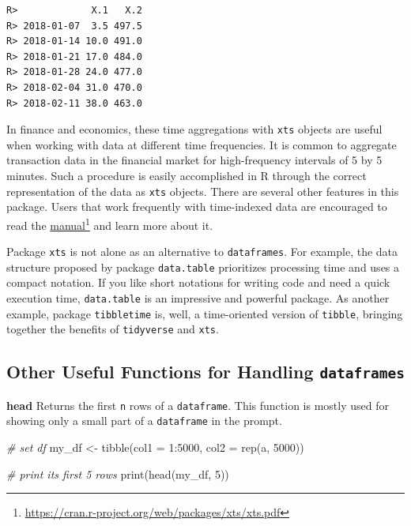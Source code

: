 \documentclass[
  12pt,
]{book}
\newenvironment{Shaded}{\begin{snugshade}}{\end{snugshade}}
\newcommand{\AttributeTok}[1]{\textcolor[rgb]{0.61,0.61,0.61}{#1}}
\newcommand{\CommentTok}[1]{\textcolor[rgb]{0.37,0.37,0.37}{\textit{#1}}}
\newcommand{\DecValTok}[1]{\textcolor[rgb]{0.06,0.06,0.06}{#1}}
\newcommand{\FunctionTok}[1]{\textcolor[rgb]{0,0,0}{#1}}
\newcommand{\NormalTok}[1]{#1}
\newcommand{\OtherTok}[1]{\textcolor[rgb]{0.37,0.37,0.37}{#1}}
\newcommand{\SpecialCharTok}[1]{\textcolor[rgb]{0,0,0}{#1}}
\newcommand{\StringTok}[1]{\textcolor[rgb]{0.5,0.5,0.5}{#1}}
\begin{document}
\begin{verbatim}
R>             X.1   X.2
R> 2018-01-07  3.5 497.5
R> 2018-01-14 10.0 491.0
R> 2018-01-21 17.0 484.0
R> 2018-01-28 24.0 477.0
R> 2018-02-04 31.0 470.0
R> 2018-02-11 38.0 463.0
\end{verbatim}

In finance and economics, these time aggregations with \texttt{xts} objects are useful when working with data at different time frequencies. It is common to aggregate transaction data in the financial market for high-frequency intervals of 5 by 5 minutes. Such a procedure is easily accomplished in R through the correct representation of the data as \texttt{xts} objects. There are several other features in this package. Users that work frequently with time-indexed data are encouraged to read the \href{https://cran.r-project.org/web/packages/xts/xts.pdf}{manual}\footnote{\url{https://cran.r-project.org/web/packages/xts/xts.pdf}} and learn more about it.

Package \texttt{xts} is not alone as an alternative to \texttt{dataframes}. For example, the data structure proposed by package \texttt{data.table} \citep{R-data.table} prioritizes processing time and uses a compact notation. If you like short notations for writing code and need a quick execution time, \texttt{data.table} is an impressive and powerful package. As another example, package \texttt{tibbletime} \citep{R-tibbletime} is, well, a time-oriented version of \texttt{tibble}, bringing together the benefits of \texttt{tidyverse} and \texttt{xts}.  

\hypertarget{other-useful-functions-for-handling-dataframes}{%
\subsection{\texorpdfstring{Other Useful Functions for Handling \texttt{dataframes}}{Other Useful Functions for Handling dataframes}}\label{other-useful-functions-for-handling-dataframes}}

\textbf{head} Returns the first \texttt{n} rows of a \texttt{dataframe}. This function is mostly used for showing only a small part of a \texttt{dataframe} in the prompt. 

\begin{Shaded}
\begin{Highlighting}[]
\CommentTok{\# set df}
\NormalTok{my\_df }\OtherTok{\textless{}{-}} \FunctionTok{tibble}\NormalTok{(}\AttributeTok{col1 =} \DecValTok{1}\SpecialCharTok{:}\DecValTok{5000}\NormalTok{, }
                \AttributeTok{col2 =} \FunctionTok{rep}\NormalTok{(}\StringTok{\textquotesingle{}a\textquotesingle{}}\NormalTok{, }\DecValTok{5000}\NormalTok{))}

\CommentTok{\# print its first 5 rows}
\FunctionTok{print}\NormalTok{(}\FunctionTok{head}\NormalTok{(my\_df, }\DecValTok{5}\NormalTok{))}
\end{Highlighting}
\end{Shaded}
\end{document}
